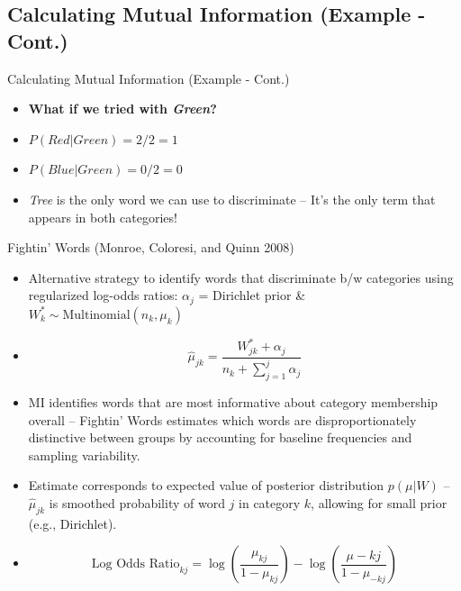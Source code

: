 \documentclass[
  ignorenonframetext,
  aspectratio=169]{beamer}
\begin{document}
\subsection{Calculating Mutual Information (Example -
Cont.)}\label{calculating-mutual-information-example---cont.-2}

\begin{frame}{Calculating Mutual Information (Example - Cont.)}
\begin{itemize}
\item \textbf{What if we tried with \textit{Green}?} \par \vspace{2.5mm} \pause
  \item[]  $P(Red|Green) = 2/2 = 1$
  \item[]  $P(Blue|Green) = 0/2 = 0$ \par \vspace{5mm}
  \item \textit{Tree} is the only word we can use to discriminate -- It's the only term that appears in both categories!
\end{itemize}
\end{frame}

\begin{frame}{Fightin' Words (Monroe, Coloresi, and Quinn 2008)}
\label{fightin-words-monroe-coloresi-and-quinn-2008}
\begin{itemize}
\item Alternative strategy to identify words that discriminate b/w categories using regularized log-odds ratios: $\alpha_j$ = Dirichlet prior \& $W^*_{k} \sim \text{Multinomial}(n_k,\mu_k)$ 
\item[] $$\hat{\mu}_{jk} = \frac{W^*_{jk} + \alpha_j}{n_k + \sum^j_{j=1}\alpha_j}$$ \par \vspace{2.5mm}
\item MI identifies words that are most informative about category membership overall -- Fightin’ Words estimates which words are disproportionately distinctive between groups by accounting for baseline frequencies and sampling variability.
\item Estimate corresponds to expected value of posterior distribution $p(\mu|W)$ -- $\hat{\mu}_{jk}$ is smoothed probability of word $j$ in category $k$, allowing for small prior (e.g., Dirichlet). 
\item[] $$ \text{Log Odds Ratio}_{kj} = \log(\frac{\mu_{kj}}{1-\mu_{kj}}) - \log(\frac{\mu-kj}{1-\mu_{-kj}}) $$
\end{itemize}
\end{frame}
\end{document}
